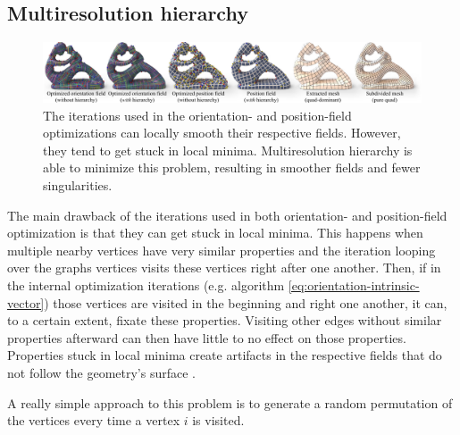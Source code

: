 \documentclass{ACGSeminar}
\begin{document}
\subsection{Multiresolution hierarchy}
\begin{figure}[htb!]
	\begin{centering}
		\includegraphics[width=\textwidth]{img/multiresolution-hierarchy.png}\par
	\end{centering}
	\caption{The iterations used in the orientation- and position-field optimizations can locally smooth their respective fields. However, they tend to get stuck in local minima. Multiresolution hierarchy is able to minimize this problem, resulting in smoother fields and fewer singularities. \cite{jakob2015instant}}
	\label{fig:multireolution-hierarchy}
\end{figure}

The main drawback of the iterations used in both orientation- and position-field optimization is that they can get stuck in local minima. This happens when multiple nearby vertices have very similar properties and the iteration looping over the graphs vertices visits these vertices right after one another. Then, if in the internal optimization iterations (e.g. algorithm \eqref{eq:orientation-intrinsic-vector}) those vertices are visited in the beginning and right one another, it can, to a certain extent, fixate these properties. Visiting other edges without similar properties afterward can then have little to no effect on those properties. Properties stuck in local minima create artifacts in the respective fields that do not follow the geometry's surface \cite{jakob2015instant}.\bigskip

A really simple approach to this problem is to generate a random permutation of the vertices every time a vertex $i$ is visited.
\end{document}
